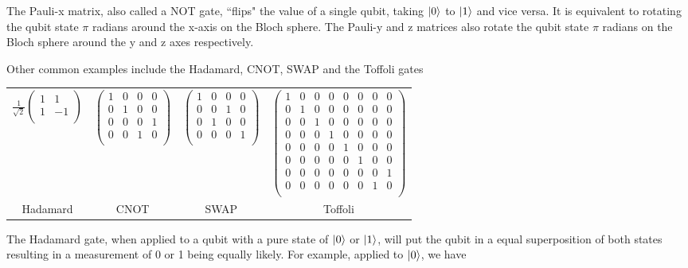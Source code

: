 \documentclass[11pt]{report}
\newcommand{\?}{\stackrel{?}{=}}
\begin{document}
The Pauli-x matrix, also called a NOT gate, ``flips" the value of a single qubit, taking $\ket{0}$ to $\ket{1}$ and vice versa. It is equivalent to rotating the qubit state $\pi$ radians around the x-axis on the Bloch sphere. The Pauli-y and z matrices also rotate the qubit state $\pi$ radians on the Bloch sphere around the y and z axes respectively.

Other common examples include the Hadamard, CNOT, SWAP and the Toffoli gates

\begin{table}[h!]
\centering
\begin{tabular}{ c c c c }
$\frac{1}{\sqrt{2}}\begin{pmatrix}
1 & 1 \\
1 & -1 \\
\end{pmatrix}$ &
$\begin{pmatrix}
1 & 0 & 0 & 0 \\
0 & 1 & 0 & 0 \\
0 & 0 & 0 & 1 \\
0 & 0 & 1 & 0 \\
\end{pmatrix}$ & 
$\begin{pmatrix}
1 & 0 & 0 & 0 \\
0 & 0 & 1 & 0 \\
0 & 1 & 0 & 0 \\
0 & 0 & 0 & 1 \\
\end{pmatrix}$ & 
$\begin{pmatrix}
1 & 0 & 0 & 0 & 0 & 0 & 0 & 0 \\
0 & 1 & 0 & 0 & 0 & 0 & 0 & 0 \\
0 & 0 & 1 & 0 & 0 & 0 & 0 & 0 \\
0 & 0 & 0 & 1 & 0 & 0 & 0 & 0 \\
0 & 0 & 0 & 0 & 1 & 0 & 0 & 0 \\
0 & 0 & 0 & 0 & 0 & 1 & 0 & 0 \\
0 & 0 & 0 & 0 & 0 & 0 & 0 & 1 \\
0 & 0 & 0 & 0 & 0 & 0 & 1 & 0 \\
\end{pmatrix}$ \\
  Hadamard & CNOT & SWAP & Toffoli \\
\end{tabular}
\end{table}

The Hadamard gate, when applied to a qubit with a pure state of $\ket{0}$ or $\ket{1}$, will put the qubit in a equal superposition of both states resulting in a measurement of 0 or 1 being equally likely. For example, applied to $\ket{0}$, we have
\end{document}
